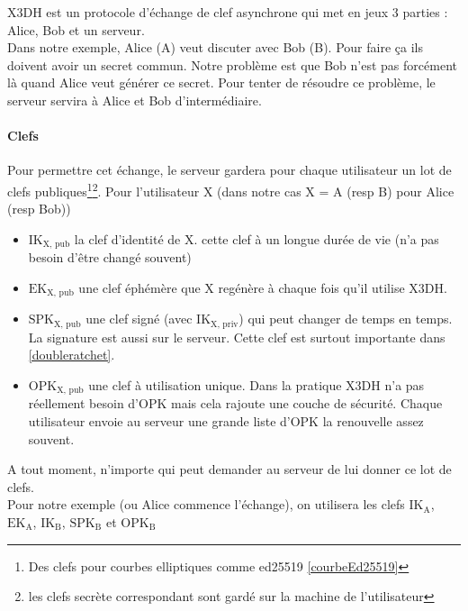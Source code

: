 \documentclass[a4paper, 12pt]{article}
\begin{document}
X3DH est un protocole d'échange de clef asynchrone qui met en jeux 3 parties : Alice, Bob et un serveur. \\
Dans notre exemple, Alice (A) veut discuter avec Bob (B). Pour faire ça ils doivent avoir un secret commun. Notre problème est que Bob n'est pas forcément là quand Alice veut générer ce secret. Pour tenter de résoudre ce problème, le serveur servira à Alice et Bob d'intermédiaire.

\paragraph{Clefs}
Pour permettre cet échange, le serveur gardera pour chaque utilisateur un lot de clefs publiques\footnote{Des clefs pour courbes elliptiques comme ed25519 \ref{courbeEd25519}}\footnote{les clefs secrète correspondant sont gardé sur la machine de l'utilisateur}. 
Pour l'utilisateur X (dans notre cas X = A (resp B) pour Alice (resp Bob))
\begin{itemize}
	\item $\text{IK}_{\text{X, pub}}$ la clef d'identité de X. cette clef à un longue durée de vie (n'a pas besoin d'être changé souvent)
	\item $\text{EK}_{\text{X, pub}}$ une clef éphémère que X regénère à chaque fois qu'il utilise X3DH.
	\item $\text{SPK}_{\text{X, pub}}$ une clef signé (avec $\text{IK}_{\text{X, priv}}$) qui peut changer de temps en temps. La signature est aussi sur le serveur. Cette clef est surtout importante dans \ref{doubleratchet}. 
	\item $\text{OPK}_{\text{X, pub}}$ une clef à utilisation unique. Dans la pratique X3DH n'a pas réellement besoin d'OPK mais cela rajoute une couche de sécurité. Chaque utilisateur envoie au serveur une grande liste d'OPK la renouvelle assez souvent.
\end{itemize}
A tout moment, n'importe qui peut demander au serveur de lui donner ce lot de clefs.\\

Pour notre exemple (ou Alice commence l'échange), on utilisera les clefs $\text{IK}_{\text{A}}$, $\text{EK}_{\text{A}}$, $\text{IK}_{\text{B}}$, $\text{SPK}_{\text{B}}$ et $\text{OPK}_{\text{B}}$
\end{document}

